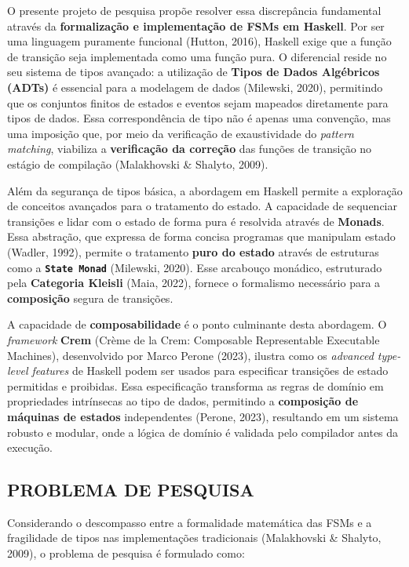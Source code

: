 \documentclass[12pt,a4paper]{article}
\begin{document}
O presente projeto de pesquisa propõe resolver essa discrepância fundamental através da \textbf{formalização e implementação de FSMs em Haskell}. Por ser uma linguagem puramente funcional (Hutton, 2016), Haskell exige que a função de transição seja implementada como uma função pura. O diferencial reside no seu sistema de tipos avançado: a utilização de \textbf{Tipos de Dados Algébricos (ADTs)} é essencial para a modelagem de dados (Milewski, 2020), permitindo que os conjuntos finitos de estados e eventos sejam mapeados diretamente para tipos de dados. Essa correspondência de tipo não é apenas uma convenção, mas uma imposição que, por meio da verificação de exaustividade do \textit{pattern matching}, viabiliza a \textbf{verificação da correção} das funções de transição no estágio de compilação (Malakhovski \& Shalyto, 2009).

Além da segurança de tipos básica, a abordagem em Haskell permite a exploração de conceitos avançados para o tratamento do estado. A capacidade de sequenciar transições e lidar com o estado de forma pura é resolvida através de \textbf{Monads}. Essa abstração, que expressa de forma concisa programas que manipulam estado (Wadler, 1992), permite o tratamento \textbf{puro do estado} através de estruturas como a \textbf{\texttt{State Monad}} (Milewski, 2020). Esse arcabouço monádico, estruturado pela \textbf{Categoria Kleisli} (Maia, 2022), fornece o formalismo necessário para a \textbf{composição} segura de transições.

A capacidade de \textbf{composabilidade} é o ponto culminante desta abordagem. O \textit{framework} \textbf{Crem} (Crème de la Crem: Composable Representable Executable Machines), desenvolvido por Marco Perone (2023), ilustra como os \textit{advanced type-level features} de Haskell podem ser usados para especificar transições de estado permitidas e proibidas. Essa especificação transforma as regras de domínio em propriedades intrínsecas ao tipo de dados, permitindo a \textbf{composição de máquinas de estados} independentes (Perone, 2023), resultando em um sistema robusto e modular, onde a lógica de domínio é validada pelo compilador antes da execução.

\subsection{PROBLEMA DE PESQUISA}

Considerando o descompasso entre a formalidade matemática das FSMs e a fragilidade de tipos nas implementações tradicionais (Malakhovski \& Shalyto, 2009), o problema de pesquisa é formulado como:
\end{document}

